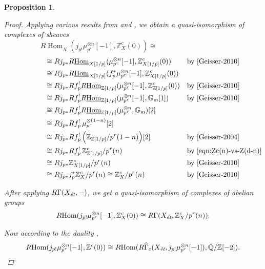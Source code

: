 \documentclass[leqno,12pt]{article}
\theoremstyle{plain}
\newtheorem{proposition}[theorem]{\indent\sc Proposition}
\theoremstyle{definition}
\DeclareMathOperator{\Hom}{Hom}
\newcommand{\QQ}{\mathbb{Q}}
\newcommand{\ZZ}{\mathbb{Z}}
\newcommand{\et}{\text{\it \'{e}t}}
\newcommand{\iHom}{\underline{\Hom}}
\newcommand{\RHom}{R\!\Hom}
\begin{document}
\begin{proposition}
\begin{proof}
    Applying various results from \cite{Geisser-2004} and \cite{Geisser-2010},
    we obtain a quasi-isomorphism of complexes of sheaves
    \[ R\iHom_X (j_{p!} \mu_{p^r}^{\otimes n} [-1], \ZZ^c_X (0)) \cong \hspace{4cm} \]
    \begin{align*}
      \hspace{2cm} & \cong R j_{p*} R\iHom_{X [1/p]} (\mu_{p^r}^{\otimes n} [-1], \ZZ^c_{X [1/p]} (0)) && \text{by \cite[Prop. 7.10~(c)]{Geisser-2010}} \\
      & \cong R j_{p*} R\iHom_{X[1/p]} (f_p^* \mu_{p^r}^{\otimes n} [-1], \ZZ^c_{X [1/p]} (0)) \\
      & \cong R j_{p*} R f^!_p R\iHom_{\ZZ [1/p]} (\mu_{p^r}^{\otimes n} [-1], \ZZ^c_{\ZZ [1/p]} (0)) && \text{by \cite[Prop. 7.10~(c)]{Geisser-2010}} \\
                                                                & \cong R j_{p*} R f^!_p R\iHom_{\ZZ [1/p]} (\mu_{p^r}^{\otimes n} [-1], \mathbb{G}_\mathrm{m} [1]) && \text{by \cite[Lemma~7.4]{Geisser-2010}} \\
      & \cong R j_{p*} R f^!_p R\iHom_{\ZZ [1/p]} (\mu_{p^r}^{\otimes n}, \mathbb{G}_\mathrm{m}) [2] \\
                                                                & \cong R j_{p*} R f^!_p \, \mu_{p^r}^{\otimes (1-n)} [2] \\
      & \cong R j_{p*} R f^!_p \, \Bigl(\ZZ_{\ZZ [1/p]}/p^r (1-n)\Bigr) [2] && \text{by \cite[Thm.~1.2]{Geisser-2004}} \\
                                                                & \cong R j_{p*} R f^!_p \, \ZZ^c_{\ZZ [1/p]}/p^r (n) && \text{by \eqref{eqn:Zc(n)-vs-Z(d-n)}} \\
                                                                & \cong R j_{p*} \ZZ^c_{X [1/p]} / p^r (n) && \text{by \cite[Prop.~7.10~(a)]{Geisser-2010}} \\
                                                                & \cong R j_{p*} j_p^*\ZZ^c_X/p^r (n) \cong \ZZ^c_X/p^r (n) && \text{by \cite[Thm.~7.2~(a), Prop.~2.3]{Geisser-2010}}
    \end{align*}

    After applying $R\Gamma (X_\et, -)$, we get a quasi-isomorphism of
    complexes of abelian groups
    \[
      \RHom (j_{p!} \mu_{p^r}^{\otimes n} [-1], \ZZ^c_X (0)) \cong
      R\Gamma (X_\et, \ZZ^c_X/p^r (n)).
    \]

    Now according to the duality \cite[Theorem~7.8]{Geisser-2010},
    \[
      \RHom (j_{p !} \mu_{p^r}^{\otimes n} [-1], \ZZ^c (0)) \cong
      \RHom (R\widehat{\Gamma}_c (X_\et, j_{p !} \mu_{p^r}^{\otimes n} [-1]), \QQ/\ZZ [-2]).
    \]


\end{proof}
\end{proposition}
\end{document}
